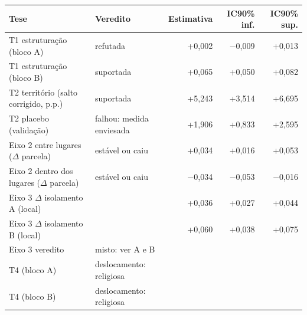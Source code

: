 \begin{tabular}{llrrr}
\toprule
Tese & Veredito & Estimativa & IC90\% inf. & IC90\% sup. \\
\midrule
T1 estruturação (bloco A) & refutada & +0{,}002 & $-$0{,}009 & +0{,}013 \\
T1 estruturação (bloco B) & suportada & +0{,}065 & +0{,}050 & +0{,}082 \\
T2 território (salto corrigido, p.p.) & suportada & +5{,}243 & +3{,}514 & +6{,}695 \\
T2 placebo (validação) & falhou: medida enviesada & +1{,}906 & +0{,}833 & +2{,}595 \\
Eixo 2 entre lugares ($\Delta$ parcela) & estável ou caiu & +0{,}034 & +0{,}016 & +0{,}053 \\
Eixo 2 dentro dos lugares ($\Delta$ parcela) & estável ou caiu & $-$0{,}034 & $-$0{,}053 & $-$0{,}016 \\
Eixo 3 $\Delta$ isolamento A (local) &  & +0{,}036 & +0{,}027 & +0{,}044 \\
Eixo 3 $\Delta$ isolamento B (local) &  & +0{,}060 & +0{,}038 & +0{,}075 \\
Eixo 3 veredito & misto: ver A e B &  &  &  \\
T4 (bloco A) & deslocamento: religiosa &  &  &  \\
T4 (bloco B) & deslocamento: religiosa &  &  &  \\
\bottomrule
\end{tabular}
